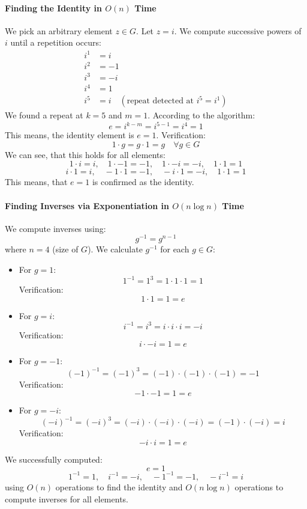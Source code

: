 \documentclass[sigconf]{acmart}
\begin{document}
\paragraph{Finding the Identity in \( O(n) \) Time}
We pick an arbitrary element \( z \in G \). Let \( z = i \).
We compute successive powers of \( i \) until a repetition occurs:
\begin{align*}
i^1 &= i \\
i^2 &= -1 \\
i^3 &= -i \\
i^4 &= 1 \\
i^5 &= i \quad (\text{repeat detected at } i^5 = i^1)
\end{align*}
We found a repeat at \( k = 5 \) and \( m = 1 \). According to the algorithm:\[e = i^{k - m} = i^{5 - 1} = i^4 = 1\]
This means, the identity element is \( e = 1 \).
Verification:\[1 \cdot g = g \cdot 1 = g \quad \forall g \in G\]
We can see, that this holds for all elements:\[1 \cdot i = i,\quad 1 \cdot -1 = -1,\quad 1 \cdot -i = -i,\quad 1 \cdot 1 = 1\]
\[i \cdot 1 = i, \quad -1 \cdot 1 = -1,\quad -i \cdot 1 = -i,\quad 1 \cdot 1 = 1\]
This means, that \( e = 1 \) is confirmed as the identity.
    
\paragraph{Finding Inverses via Exponentiation in \( O(n \log n) \) Time}
We compute inverses using:\[g^{-1} = g^{n-1}\]
where \( n = 4 \) (size of \( G \)).
We calculate \( g^{-1} \) for each \( g \in G \):
\begin{itemize}
    \item For \( g = 1 \):\[1^{-1} = 1^{3} = 1 \cdot 1 \cdot 1 = 1\]
    Verification:\[1 \cdot 1 = 1 = e\]
    \item For \( g = i \):\[i^{-1} = i^{3} = i \cdot i \cdot i = -i\]
    Verification:\[i \cdot -i = 1 = e\]
    \item For \( g = -1 \):\[(-1)^{-1} = (-1)^{3} = (-1) \cdot (-1) \cdot (-1) = -1\]
    Verification:\[-1 \cdot -1 = 1 = e\]
    \item For \( g = -i \):\[(-i)^{-1} = (-i)^{3} = (-i) \cdot (-i) \cdot (-i) = (-1) \cdot (-i) = i \]
    Verification:\[-i \cdot i = 1 = e\]
\end{itemize}

We successfully computed:\[e = 1\]
\[1^{-1} = 1,\quad i^{-1} = -i,\quad -1^{-1} = -1,\quad -i^{-1} = i\] using \( O(n) \) operations to find the identity and \( O(n \log n) \) operations to compute inverses for all elements.
\end{document}
